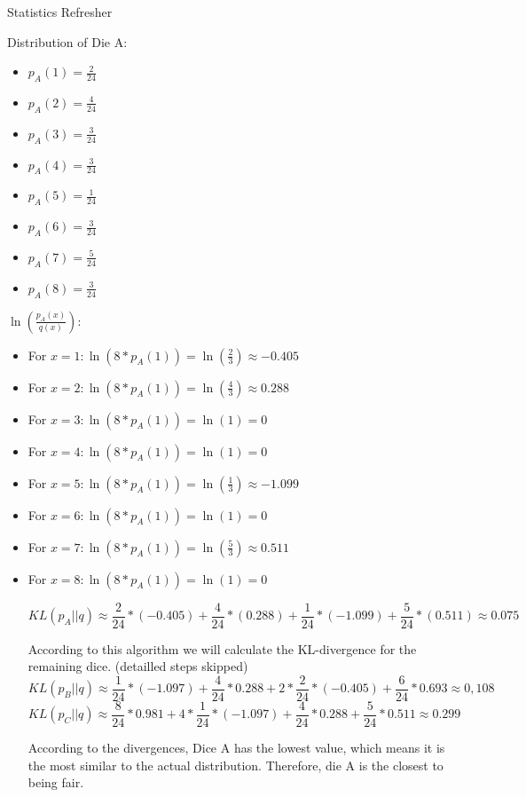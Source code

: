 \documentclass[
	english,
        solution=true
	]{tudaexercise}
\begin{document}
\begin{task}[points=15]{Statistics Refresher}
\begin{subtask}[points=4,title=Unbiased Estimators and KL-Divergence]
\begin{solution}
\begin{enumerate}
Distribution of Die A:
\begin{itemize}
    \item $p_A(1)=\frac{2}{24}$
    \item $p_A(2)=\frac{4}{24}$
    \item $p_A(3)=\frac{3}{24}$
    \item $p_A(4)=\frac{3}{24}$
    \item $p_A(5)=\frac{1}{24}$
    \item $p_A(6)=\frac{3}{24}$
    \item $p_A(7)=\frac{5}{24}$
    \item $p_A(8)=\frac{3}{24}$
\end{itemize}

$\ln(\frac{p_A(x)}{q(x)})$:
\begin{itemize}
    \item For $x=1: \ln(8*p_A(1))=\ln(\frac{2}{3})\approx -0.405$
    \item For $x=2: \ln(8*p_A(1))=\ln(\frac{4}{3})\approx 0.288$
    \item For $x=3: \ln(8*p_A(1))=\ln(1)=0$
    \item For $x=4: \ln(8*p_A(1))=\ln(1)=0$
    \item For $x=5: \ln(8*p_A(1))=\ln(\frac{1}{3})\approx -1.099$
    \item For $x=6: \ln(8*p_A(1))=\ln(1)=0$
    \item For $x=7: \ln(8*p_A(1))=\ln(\frac{5}{3})\approx 0.511$
    \item For $x=8: \ln(8*p_A(1))=\ln(1)=0$

\[KL(p_A||q) \approx \frac{2}{24}*(-0.405)+\frac{4}{24}*(0.288)+\frac{1}{24}*(-1.099)+\frac{5}{24}*(0.511)\approx 0.075\]

According to this algorithm we will calculate the KL-divergence for the remaining dice. (detailled steps skipped)
\[KL(p_B||q)\approx \frac{1}{24}*(-1.097)+\frac{4}{24}*0.288+2*\frac{2}{24}*(-0.405)+\frac{6}{24}*0.693\approx 0,108\]
\[KL(p_C||q)\approx \frac{8}{24}*0.981+4*\frac{1}{24}*(-1.097)+\frac{4}{24}*0.288+\frac{5}{24}*0.511\approx0.299\]

According to the divergences, Dice A has the lowest value, which means it is the most similar to the actual distribution. Therefore, die A is the closest to being fair.
\end{itemize}
    
\end{enumerate}

\end{solution}
\end{subtask}


\end{task}
\end{document}
